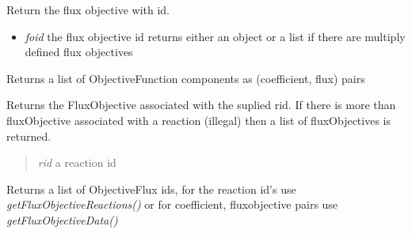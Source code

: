\documentclass[a4paper,11pt,english]{sphinxmanual}
\begin{document}
\begin{fulllineitems}
\begin{fulllineitems}
\label{modules_doc:cbmpy.CBModel.Objective.getFluxObjective}
Return the flux objective with id.
\begin{itemize}
\item {} 
\emph{foid} the flux objective id returns either an object or a list if there are multiply defined flux objectives

\end{itemize}

\end{fulllineitems}


\begin{fulllineitems}
\label{modules_doc:cbmpy.CBModel.Objective.getFluxObjectiveData}
Returns a list of ObjectiveFunction components as (coefficient, flux) pairs

\end{fulllineitems}


\begin{fulllineitems}
\label{modules_doc:cbmpy.CBModel.Objective.getFluxObjectiveForReaction}
Returns the FluxObjective associated with the suplied rid. If there is more than fluxObjective associated with a reaction (illegal)
then a list of fluxObjectives is returned.
\begin{quote}

\emph{rid} a reaction id
\end{quote}

\end{fulllineitems}


\begin{fulllineitems}
\label{modules_doc:cbmpy.CBModel.Objective.getFluxObjectiveIDs}
Returns a list of ObjectiveFlux ids, for the reaction id's use \emph{getFluxObjectiveReactions()}
or for coefficient, fluxobjective pairs use \emph{getFluxObjectiveData()}

\end{fulllineitems}


\end{fulllineitems}
\end{document}
